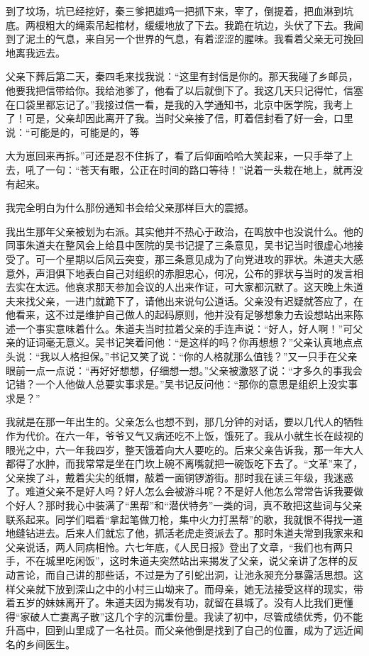 \documentclass[12pt,oneside]{book}
\begin{document}
到了坟场，坑已经挖好，秦三爹把雄鸡一把抓下来，宰了，倒提着，把血淋到坑底。两根粗大的绳索吊起棺材，缓缓地放了下去。我跪在坑边，头伏了下去。我闻到了泥土的气息，来自另一个世界的气息，有着涩涩的腥味。我看着父亲无可挽回地离我远去。

父亲下葬后第二天，秦四毛来找我说：``这里有封信是你的。那天我碰了乡邮员，他要我把信带给你。我给池爹了，他看了以后就倒下了。我这几天只记得忙，信塞在口袋里都忘记了。''我接过信一看，是我的入学通知书，北京中医学院，我考上了！可是，父亲却因此离开了我。当时父亲接了信，盯着信封看了好一会，口里说：``可能是的，可能是的，等

大为崽回来再拆。''可还是忍不住拆了，看了后仰面哈哈大笑起来，一只手举了上去，吼了一句：``苍天有眼，公正在时间的路口等待！''说着一头栽在地上，就再没有起来。

我完全明白为什么那份通知书会给父亲那样巨大的震撼。

我出生那年父亲被划为右派。其实他并不热心于政治，在鸣放中也没说什么。他的同事朱道夫在整风会上给县中医院的吴书记提了三条意见，吴书记当时很虚心地接受了。可一个星期以后风云突变，那三条意见成为了向党进攻的罪状。朱道夫大感意外，声泪俱下地表白自己对组织的赤胆忠心，何况，公布的罪状与当时的发言相去实在太远。他哀求那天参加会议的人出来作证，可大家都沉默了。这天晚上朱道夫来找父亲，一进门就跪下了，请他出来说句公道话。父亲没有迟疑就答应了，在他看来，这不过是维护自己做人的起码原则，他并没有足够想象力去设想站出来陈述一个事实意味着什么。朱道夫当时拉着父亲的手连声说：``好人，好人啊！''可父亲的证词毫无意义。吴书记笑着问他：``是这样的吗？你再想想？''父亲认真地点点头说：``我以人格担保。''书记又笑了说：``你的人格就那么值钱？''又一只手在父亲眼前一点一点说：``再好好想想，仔细想一想。''父亲被激怒了说：``才多久的事我会记错？一个人他做人总要实事求是。''吴书记反问他：``那你的意思是组织上没实事求是？''

我就是在那一年出生的。父亲怎么也想不到，那几分钟的对话，要以几代人的牺牲作为代价。在六一年，爷爷又气又病还吃不上饭，饿死了。我从小就生长在歧视的眼光之中，六一年我四岁，整天饿着向大人要吃的。后来父亲告诉我，那一年大人都得了水肿，而我常常是坐在门坎上碗不离嘴就把一碗饭吃下去了。``文革''来了，父亲挨了斗，戴着尖尖的纸帽，敲着一面铜锣游街。那时我在读三年级，我迷惑了。难道父亲不是好人吗？好人怎么会被游斗呢？不是好人他怎么常常告诉我要做个好人？那时我心中装满了``黑帮''和``潜伏特务''一类的词，真不敢把这些词与父亲联系起来。同学们唱着``拿起笔做刀枪，集中火力打黑帮''的歌，我就恨不得找一道地缝钻进去。后来人们就忘了他，抓活老虎走资派去了。那时朱道夫常到我家来和父亲说话，两人同病相怜。六七年底，《人民日报》登出了文章，``我们也有两只手，不在城里吃闲饭''，这时朱道夫突然站出来揭发了父亲，说父亲讲了怎样的反动言论，而自己讲的那些话，不过是为了引蛇出洞，让池永昶充分暴露活思想。这样父亲就下放到深山之中的小村三山坳来了。而母亲，她无法接受这样的现实，带着五岁的妹妹离开了。朱道夫因为揭发有功，就留在县城了。没有人比我们更懂得``家破人亡妻离子散''这几个字的沉重份量。我读了初中，尽管成绩优秀，仍不能升高中，回到山里成了一名社员。而父亲他倒是找到了自己的位置，成为了远近闻名的乡间医生。
\end{document}
